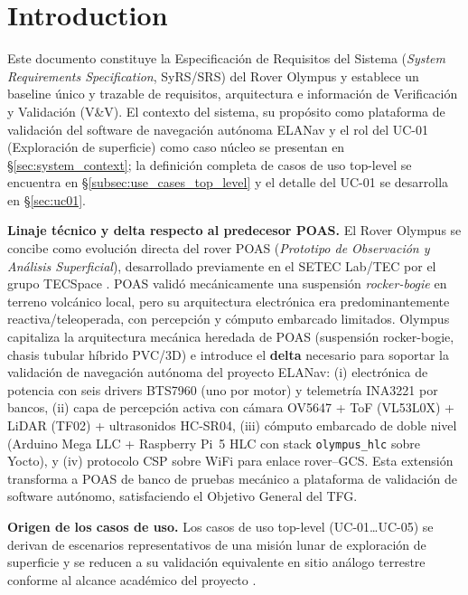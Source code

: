 
\section{Introduction}
 Este documento constituye la Especificación de Requisitos del Sistema (\textit{System Requirements Specification}, SyRS/SRS) del Rover Olympus y establece un baseline único y trazable de requisitos, arquitectura e información de Verificación y Validación (V\&V). El contexto del sistema, su propósito como plataforma de validación del software de navegación autónoma ELANav y el rol del UC-01 (Exploración de superficie) como caso núcleo se presentan en §\ref{sec:system_context}; la definición completa de casos de uso top-level se encuentra en §\ref{subsec:use_cases_top_level} y el detalle del UC-01 se desarrolla en §\ref{sec:uc01}.

\textbf{Linaje técnico y delta respecto al predecesor POAS.} El Rover Olympus se concibe como evolución directa del rover POAS (\textit{Prototipo de Observación y Análisis Superficial}), desarrollado previamente en el SETEC Lab/TEC por el grupo TECSpace \cite{tecspace2021poas}. POAS validó mecánicamente una suspensión \textit{rocker-bogie} en terreno volcánico local, pero su arquitectura electrónica era predominantemente reactiva/teleoperada, con percepción y cómputo embarcado limitados. Olympus capitaliza la arquitectura mecánica heredada de POAS (suspensión rocker-bogie, chasis tubular híbrido PVC/3D) e introduce el \textbf{delta} necesario para soportar la validación de navegación autónoma del proyecto ELANav: (i) electrónica de potencia con seis drivers BTS7960 (uno por motor) y telemetría INA3221 por bancos, (ii) capa de percepción activa con cámara OV5647 + ToF (VL53L0X) + LiDAR (TF02) + ultrasonidos HC-SR04, (iii) cómputo embarcado de doble nivel (Arduino Mega LLC + Raspberry Pi~5 HLC con stack \texttt{olympus\_hlc} sobre Yocto), y (iv) protocolo CSP sobre WiFi para enlace rover--GCS. Esta extensión transforma a POAS de banco de pruebas mecánico a plataforma de validación de software autónomo, satisfaciendo el Objetivo General del TFG.

\textbf{Origen de los casos de uso.} Los casos de uso top-level (UC-01\dots UC-05) se derivan de escenarios representativos de una misión lunar de exploración de superficie y se reducen a su validación equivalente en sitio análogo terrestre conforme al alcance académico del proyecto \cite{ieee_29148, nasa_se_handbook}.


